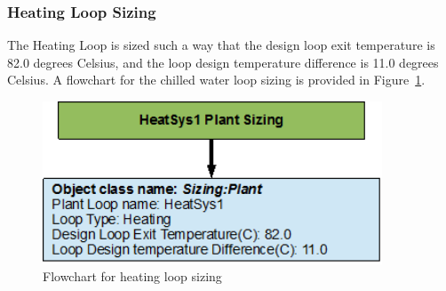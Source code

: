 \subsubsection{Heating Loop Sizing}\label{heating-loop-sizing}

The Heating Loop is sized such a way that the design loop exit temperature is 82.0 degrees Celsius, and the loop design temperature difference is 11.0 degrees Celsius. A flowchart for the chilled water loop sizing is provided in Figure~\ref{fig:flowchart-for-heating-loop-sizing}.

\begin{figure}[hbtp] %
\centering
\includegraphics[width=0.9\textwidth, height=0.9\textheight, keepaspectratio=true]{media/image086.png}
\caption{Flowchart for heating loop sizing \protect \label{fig:flowchart-for-heating-loop-sizing}}
\end{figure}
